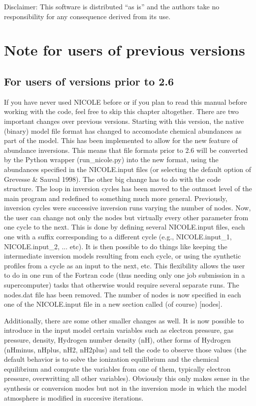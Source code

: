 Disclaimer: This software is distributed ``as is'' and the authors
take no responsibility for any consequence derived from its use.


\chapter{Note for users of previous versions}

\section{For users of versions prior to 2.6}

If you have never used NICOLE before or if you plan to read this
manual before working with the code, feel free to skip this chapter
altogether.  There are two important changes over previous
versions. Starting with this version, the native (binary) model file
format has changed to accomodate chemical abundances as part of the
model. This has been implemented to allow for the new feature of
abundance inversions. This means that file formats prior to 2.6 will
be converted by the Python wrapper (run\_nicole.py) into the new
format, using the abundances specified in the NICOLE.input files (or
selecting the default option of Grevesse \& Sauval 1998). The other
big change has to do with the code structure. The loop in inversion
cycles has been moved to the outmost level of the main program and
redefined to something much more general. Previously, inversion cycles
were successive inversion runs varying the number of nodes. Now, the
user can change not only the nodes but virtually every other parameter
from one cycle to the next. This is done by defining several
NICOLE.input files, each one with a suffix corresponding to a
different cycle (e.g., NICOLE.input\_1, NICOLE.input\_2, ... etc). It
is then possible to do things like keeping the intermediate inversion
models resulting from each cycle, or using the synthetic profiles from
a cycle as an input to the next, etc. This flexibility allows the user
to do in one run of the Fortran code (thus needing only one job
submission in a supercomputer) tasks that otherwise would require
several separate runs. The nodes.dat file has been removed. The number
of nodes is now specified in each one of the NICOLE.input file in a
new section called (of course) [nodes].

Additionally, there are some other smaller changes as well. It is now
possible to introduce in the input model certain variables such as
electron pressure, gas pressure, density, Hydrogen number density
(nH), other forms of Hydrogen (nHminus, nHplus, nH2, nH2plus) and
tell the code to observe those values (the default behavior is to solve
the ionization equilibrium and the chemical equilibrium and compute
the variables from one of them, typically electron pressure,
overwritting all other variables). Obviously this only makes sense in
the synthesis or conversion modes but not in the inversion mode in
which the model atmosphere is modified in succesive iterations.

